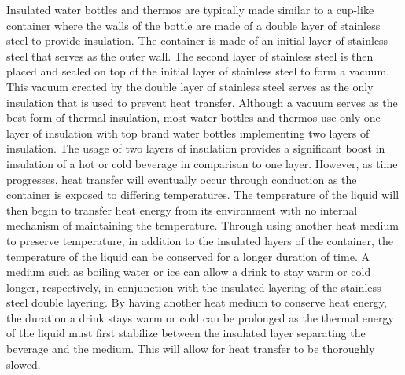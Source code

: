 \documentclass[english]{uspatent}
\begin{document}
Insulated water bottles and thermos are typically made similar to a cup-like container where the walls of the bottle are made of a double layer of stainless steel to provide insulation. The container is made of an initial layer of stainless steel that serves as the outer wall. The second layer of stainless steel is then placed and sealed on top of the initial layer of stainless steel to form a vacuum. This vacuum created by the double layer of stainless steel serves as the only insulation that is used to prevent heat transfer. Although a vacuum serves as the best form of thermal insulation, most water bottles and thermos use only one layer of insulation with top brand water bottles implementing two layers of insulation. The usage of two layers of insulation provides a significant boost in insulation of a hot or cold beverage in comparison to one layer. However, as time progresses, heat transfer will eventually occur through conduction as the container is exposed to differing temperatures. The temperature of the liquid will then begin to transfer heat energy from its environment with no internal mechanism of maintaining the temperature.
Through using another heat medium to preserve temperature, in addition to the insulated layers of the container, the temperature of the liquid can be conserved for a longer duration of time. A medium such as boiling water or ice can allow a drink to stay warm or cold longer, respectively, in conjunction with the insulated layering of the stainless steel double layering. By having another heat medium to conserve heat energy, the duration a drink stays warm or cold can be prolonged as the thermal energy of the liquid must first stabilize between the insulated layer separating the beverage and the medium. This will allow for heat transfer to be thoroughly slowed. 

\end{document}
